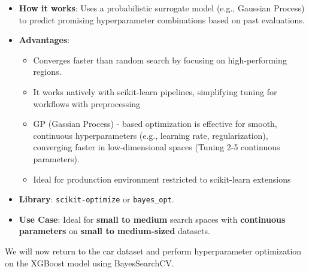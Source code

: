 \documentclass[
  letterpaper,
  DIV=11,
  numbers=noendperiod]{scrreprt}
\providecommand{\tightlist}{%
  \setlength{\itemsep}{0pt}\setlength{\parskip}{0pt}}\usepackage{longtable,booktabs,array}
\begin{document}
\begin{itemize}
\item
  \textbf{How it works}: Uses a probabilistic surrogate model (e.g.,
  Gaussian Process) to predict promising hyperparameter combinations
  based on past evaluations.
\item
  \textbf{Advantages}:

  \begin{itemize}
  \tightlist
  \item
    Converges faster than random search by focusing on high-performing
    regions.
  \item
    It works natively with scikit-learn pipelines, simplifying tuning
    for workflows with preprocessing
  \item
    GP (Gassian Process) - based optimization is effective for smooth,
    continuous hyperparameters (e.g., learning rate, regularization),
    converging faster in low-dimensional spaces (Tuning 2-5 continuous
    parameters).
  \item
    Ideal for produnction environment restricted to scikit-learn
    extensions
  \end{itemize}
\item
  \textbf{Library}: \texttt{scikit-optimize} or \texttt{bayes\_opt}.
\item
  \textbf{Use Case}: Ideal for \textbf{small to medium} search spaces
  with \textbf{continuous parameters} on \textbf{small to medium-sized}
  datasets.
\end{itemize}

We will now return to the car dataset and perform hyperparameter
optimization on the XGBoost model using BayesSearchCV.
\end{document}

